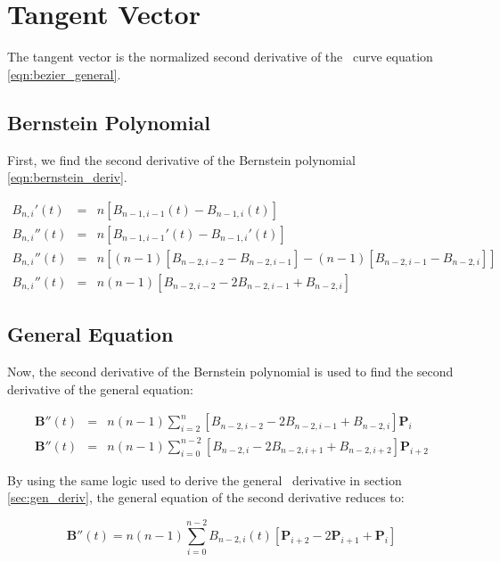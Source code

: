 \documentclass[oneside,usepdftitle=true]{article}
\begin{document}
\section{Tangent Vector}

The tangent vector is the normalized second derivative of the \Bezier\ curve equation \eqref{eqn:bezier_general}.

\subsection{Bernstein Polynomial}
First, we find the second derivative of the Bernstein polynomial \eqref{eqn:bernstein_deriv}.

\begin{eqnarray}
	\nonumber B_{n,i}'(t) &=& n [ B_{n-1,i-1}(t) - B_{n-1,i}(t) ] \\
	\nonumber B_{n,i}''(t) &=& n[ B_{n-1,i-1}'(t) - B_{n-1,i}'(t) ] \\
	\nonumber B_{n,i}''(t) &=&  n[(n-1)[B_{n-2,i-2} - B_{n-2,i-1}] - (n-1)[B_{n-2,i-1} - B_{n-2,i}]] \\
	\label{eqn:bernstein_second_deriv}
	B_{n,i}''(t) &=& n (n-1) [B_{n-2,i-2} - 2 B_{n-2,i-1} + B_{n-2,i}]
\end{eqnarray}

\subsection{General Equation}

Now, the second derivative of the Bernstein polynomial is used to find the second derivative of the general equation:

\begin{eqnarray}
	\nonumber \mathbf{B}''(t) &=& n (n-1) \sum_{i=2}^n [B_{n-2,i-2} - 2 B_{n-2,i-1} + B_{n-2,i}] \mathbf{P}_i \\
	\label{eqn:bezier_second_der_close}
	\mathbf{B}''(t) &=& n (n-1) \sum_{i=0}^{n-2} [B_{n-2,i} - 2 B_{n-2,i+1} + B_{n-2,i+2}] \mathbf{P}_{i+2}
\end{eqnarray}

By using the same logic used to derive the general \Bezier\ derivative in section \ref{sec:gen_deriv}, the general equation of the second derivative reduces to:

\begin{equation}\label{eqn:bezier_second_deriv}
	\mathbf{B}''(t) = n (n - 1) \sum_{i=0}^{n-2} B_{n-2,i}(t) [ \mathbf{P}_{i+2} - 2\mathbf{P}_{i+1} + \mathbf{P}_i ]
\end{equation}
\end{document}
